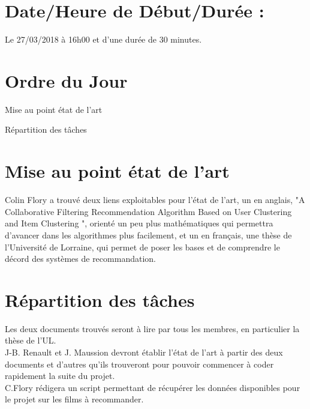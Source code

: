 \documentclass{meetingmins}
\begin{document}
\maketitle

\section{Date/Heure de Début/Durée :}
Le 27/03/2018 à 16h00 et d'une durée de 30 minutes.

\section{Ordre du Jour}
\begin{items}
\item
Mise au point état de l'art
\item
Répartition des tâches
\end{items}

\section{Mise au point état de l'art}

Colin Flory a trouvé deux liens exploitables pour l'état de l'art, un en anglais, "A Collaborative Filtering Recommendation Algorithm Based on User Clustering and Item Clustering ", orienté un peu plus mathématiques qui permettra d'avancer dans les algorithmes plus facilement, et un en français, une thèse de l'Université de Lorraine, qui permet de poser les bases et de comprendre le décord des systèmes de recommandation.
\section{Répartition des tâches}
Les deux documents trouvés seront à lire par tous les membres, en particulier la thèse de l'UL.
\\J-B. Renault et J. Maussion devront établir l'état de l'art à partir des deux documents et d'autres qu'ils trouveront pour pouvoir commencer à coder rapidement la suite du projet.
\\C.Flory rédigera un script permettant de récupérer les données disponibles pour le projet sur les films à recommander.
\end{document}

